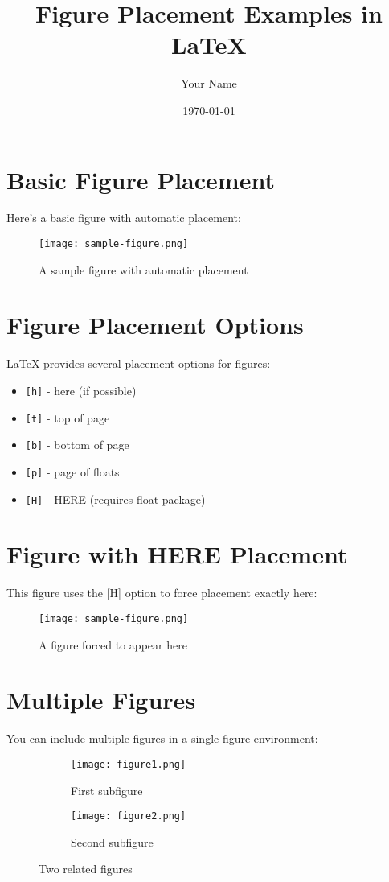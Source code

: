 \documentclass{article}
\title{Figure Placement Examples in LaTeX}
\author{Your Name}
\date{\today}
\begin{document}
\maketitle

\section{Basic Figure Placement}
Here's a basic figure with automatic placement:

\begin{figure}[h]
\centering
\texttt{[image: sample-figure.png]}
\caption{A sample figure with automatic placement}
\label{fig:sample}
\end{figure}

\section{Figure Placement Options}
LaTeX provides several placement options for figures:

\begin{itemize}
    \item \texttt{[h]} - here (if possible)
    \item \texttt{[t]} - top of page
    \item \texttt{[b]} - bottom of page
    \item \texttt{[p]} - page of floats
    \item \texttt{[H]} - HERE (requires float package)
\end{itemize}

\section{Figure with HERE Placement}
This figure uses the [H] option to force placement exactly here:

\begin{figure}[H]
\centering
\texttt{[image: sample-figure.png]}
\caption{A figure forced to appear here}
\label{fig:here}
\end{figure}

\section{Multiple Figures}
You can include multiple figures in a single figure environment:

\begin{figure}[h]
\centering
\begin{subfigure}{0.45\textwidth}
    \texttt{[image: figure1.png]}
    \caption{First subfigure}
    \label{fig:sub1}
\end{subfigure}
\hfill
\begin{subfigure}{0.45\textwidth}
    \texttt{[image: figure2.png]}
    \caption{Second subfigure}
    \label{fig:sub2}
\end{subfigure}
\caption{Two related figures}
\label{fig:multiple}
\end{figure}
\end{document}
